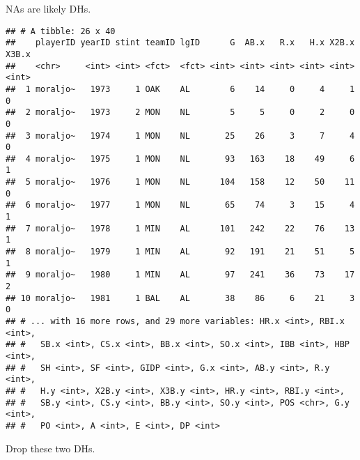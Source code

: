 \documentclass[]{book}
\newenvironment{Shaded}{\begin{snugshade}}{\end{snugshade}}
\newcommand{\KeywordTok}[1]{\textcolor[rgb]{0.13,0.29,0.53}{\textbf{#1}}}
\newcommand{\DataTypeTok}[1]{\textcolor[rgb]{0.13,0.29,0.53}{#1}}
\newcommand{\StringTok}[1]{\textcolor[rgb]{0.31,0.60,0.02}{#1}}
\newcommand{\OperatorTok}[1]{\textcolor[rgb]{0.81,0.36,0.00}{\textbf{#1}}}
\newcommand{\NormalTok}[1]{#1}
\begin{document}
NAs are likely DHs.

\begin{Shaded}
\end{Shaded}

\begin{verbatim}
## # A tibble: 26 x 40
##    playerID yearID stint teamID lgID      G  AB.x   R.x   H.x X2B.x X3B.x
##    <chr>     <int> <int> <fct>  <fct> <int> <int> <int> <int> <int> <int>
##  1 moraljo~   1973     1 OAK    AL        6    14     0     4     1     0
##  2 moraljo~   1973     2 MON    NL        5     5     0     2     0     0
##  3 moraljo~   1974     1 MON    NL       25    26     3     7     4     0
##  4 moraljo~   1975     1 MON    NL       93   163    18    49     6     1
##  5 moraljo~   1976     1 MON    NL      104   158    12    50    11     0
##  6 moraljo~   1977     1 MON    NL       65    74     3    15     4     1
##  7 moraljo~   1978     1 MIN    AL      101   242    22    76    13     1
##  8 moraljo~   1979     1 MIN    AL       92   191    21    51     5     1
##  9 moraljo~   1980     1 MIN    AL       97   241    36    73    17     2
## 10 moraljo~   1981     1 BAL    AL       38    86     6    21     3     0
## # ... with 16 more rows, and 29 more variables: HR.x <int>, RBI.x <int>,
## #   SB.x <int>, CS.x <int>, BB.x <int>, SO.x <int>, IBB <int>, HBP <int>,
## #   SH <int>, SF <int>, GIDP <int>, G.x <int>, AB.y <int>, R.y <int>,
## #   H.y <int>, X2B.y <int>, X3B.y <int>, HR.y <int>, RBI.y <int>,
## #   SB.y <int>, CS.y <int>, BB.y <int>, SO.y <int>, POS <chr>, G.y <int>,
## #   PO <int>, A <int>, E <int>, DP <int>
\end{verbatim}

Drop these two DHs.

\begin{Shaded}
\end{Shaded}
\end{document}
